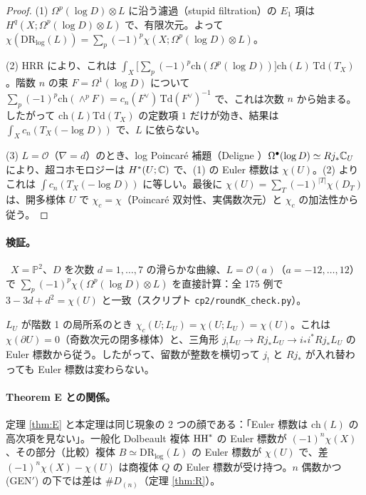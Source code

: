 \begin{proof}
(1) $\Omega^p(\log D)\otimes L$ に沿う濾過（stupid filtration）の $E_1$ 項は $H^q(X;\Omega^p(\log D)\otimes L)$ で、有限次元。よって $\chi(\mathrm{DR}_{\log}(L))=\sum_p(-1)^p\chi(X;\Omega^p(\log D)\otimes L)$。

(2) HRR により、これは $\int_X\bigl[\sum_p(-1)^p\mathrm{ch}(\Omega^p(\log D))\bigr]\mathrm{ch}(L)\,\mathrm{Td}(T_X)$。階数 $n$ の束 $F=\Omega^1(\log D)$ について $\sum_p(-1)^p\mathrm{ch}(\wedge^pF)=c_n(F^\vee)\,\mathrm{Td}(F^\vee)^{-1}$ で、これは次数 $n$ から始まる。したがって $\mathrm{ch}(L)\mathrm{Td}(T_X)$ の定数項 $1$ だけが効き、結果は $\int_Xc_n(T_X(-\log D))$ で、$L$ に依らない。

(3) $L=\mathcal O$（$\nabla=d$）のとき、log Poincar\'e 補題（Deligne \cite{Del70}）$\Omega^\bullet(\log D)\simeq Rj_*\mathbb C_U$ により、超コホモロジーは $H^*(U;\mathbb C)$ で、(1) の Euler 標数は $\chi(U)$。(2) よりこれは $\int c_n(T_X(-\log D))$ に等しい。最後に $\chi(U)=\sum_T(-1)^{|T|}\chi(D_T)$ は、開多様体 $U$ で $\chi_c=\chi$（Poincar\'e 双対性、実偶数次元）と $\chi_c$ の加法性から従う。
\end{proof}
\paragraph{検証。}\tV\ $X=\mathbb P^2$、$D$ を次数 $d=1,\dots,7$ の滑らかな曲線、$L=\mathcal O(a)$（$a=-12,\dots,12$）で $\sum_p(-1)^p\chi(\Omega^p(\log D)\otimes L)$ を直接計算：全 175 例で $3-3d+d^2=\chi(U)$ と一致（スクリプト \texttt{cp2/roundK\_check.py}）。

\begin{cor}[壁越えの恒等式\ \tP]\label{cor:wall}
$L_U$ が階数 1 の局所系のとき $\chi_c(U;L_U)=\chi(U;L_U)=\chi(U)$。これは $\chi(\partial U)=0$（奇数次元の閉多様体）と、三角形 $j_!L_U\to Rj_*L_U\to i_*i^*Rj_*L_U$ の Euler 標数から従う。したがって、留数が整数を横切って $j_!$ と $Rj_*$ が入れ替わっても Euler 標数は変わらない。
\end{cor}
\paragraph{Theorem E との関係。}定理 \ref{thm:E} と本定理は同じ現象の 2 つの顔である：「Euler 標数は $\mathrm{ch}(L)$ の高次項を見ない」。一般化 Dolbeault 複体 $\mathrm{HH}^*$ の Euler 標数が $(-1)^n\chi(X)$、その部分（比較）複体 $B\simeq\mathrm{DR}_{\log}(L)$ の Euler 標数が $\chi(U)$ で、差 $(-1)^n\chi(X)-\chi(U)$ は商複体 $Q$ の Euler 標数が受け持つ。$n$ 偶数かつ (GEN$'$) の下では差は $\#D_{(n)}$（定理 \ref{thm:R}）。

